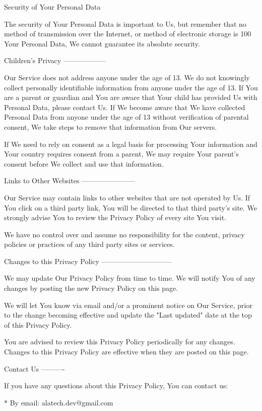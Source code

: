 Security of Your Personal Data  
~~~~~~~~~~~~~~~~~~~~~~~~~~~~~~

The security of Your Personal Data is important to Us, but remember that no
method of transmission over the Internet, or method of electronic storage is
100%
Your Personal Data, We cannot guarantee its absolute security.

Children's Privacy  
------------------

Our Service does not address anyone under the age of 13. We do not knowingly
collect personally identifiable information from anyone under the age of 13.
If You are a parent or guardian and You are aware that Your child has provided
Us with Personal Data, please contact Us. If We become aware that We have
collected Personal Data from anyone under the age of 13 without verification
of parental consent, We take steps to remove that information from Our
servers.

If We need to rely on consent as a legal basis for processing Your information
and Your country requires consent from a parent, We may require Your parent's
consent before We collect and use that information.

Links to Other Websites  
-----------------------

Our Service may contain links to other websites that are not operated by Us.
If You click on a third party link, You will be directed to that third party's
site. We strongly advise You to review the Privacy Policy of every site You
visit.

We have no control over and assume no responsibility for the content, privacy
policies or practices of any third party sites or services.

Changes to this Privacy Policy  
------------------------------

We may update Our Privacy Policy from time to time. We will notify You of any
changes by posting the new Privacy Policy on this page.

We will let You know via email and/or a prominent notice on Our Service, prior
to the change becoming effective and update the "Last updated" date at the top
of this Privacy Policy.

You are advised to review this Privacy Policy periodically for any changes.
Changes to this Privacy Policy are effective when they are posted on this
page.

Contact Us  
----------

If you have any questions about this Privacy Policy, You can contact us:

  * By email: alatech.dev@gmail.com

